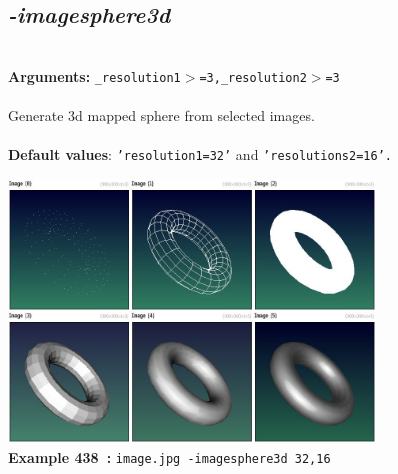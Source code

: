 \documentclass[a4paper,11pt,twoside]{book}
\begin{document}
\subsection{\emph{-imagesphere3d} }\vspace*{-0.5em}
~\\\textbf{Arguments: } 
{\small \texttt{\_resolution1$>$=3,\_resolution2$>$=3}}\\~\\
Generate 3d mapped sphere from selected images.
~\\~\\\textbf{Default values}: {\small \texttt{'resolution1=32'} and \texttt{'resolutions2=16'.}}
\begin{center}\includegraphics[keepaspectratio=true,height=7cm,width=\textwidth]{img/gmic_def438.jpg}\\
{\footnotesize \textbf{Example 438~:} \texttt{image.jpg -imagesphere3d 32,16}}
\end{center}
\end{document}
